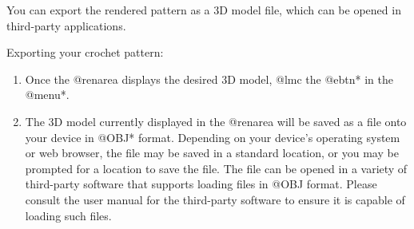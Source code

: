 \documentclass[main.tex]{subfiles}
\begin{document}
You can export the rendered pattern as a 3D model file, which can be opened in third-party applications.

Exporting your crochet pattern:
\begin{enumerate}
\item Once the @renarea displays the desired 3D model, @lmc the @ebtn* in the @menu*.
\item The 3D model currently displayed in the @renarea will be saved as a file onto your device in @OBJ* format. Depending on your device's operating system or web browser, the file may be saved in a standard location, or you may be prompted for a location to save the file. The file can be opened in a variety of third-party software that supports loading files in @OBJ format. Please consult the user manual for the third-party software to ensure it is capable of loading such files.
\end{enumerate}
\end{document}
